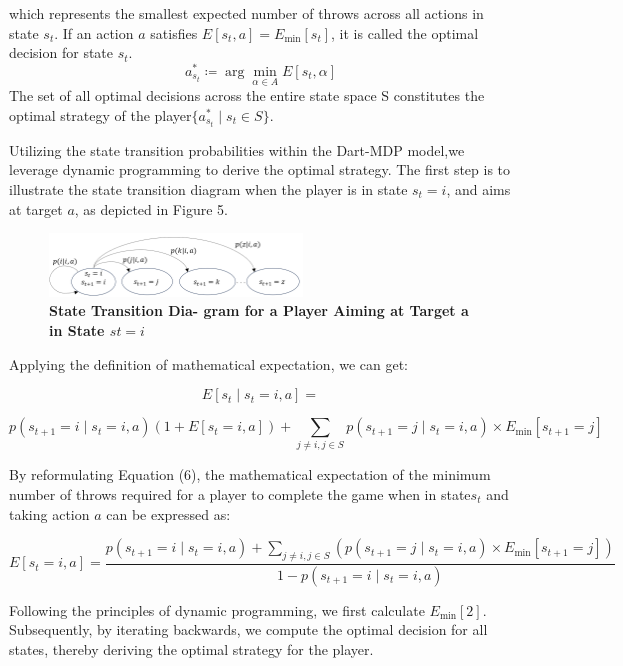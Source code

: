 \documentclass[cjjs]{ipart}
\theoremstyle{plain}
\begin{document}
which represents the smallest expected number of throws across all actions in state $s_t$. If an action $a$ satisfies $E[s_t, a] = E_{\min}[s_t]$, it is called the optimal decision for state $s_t$.
\[
a_{s_t}^* \coloneqq \arg\min_{\alpha \in A} E[s_t, \alpha]
\]
The set of all optimal decisions across the entire state space S constitutes the optimal strategy of the player$\{ a_{s_t}^* \mid s_t \in S \}$.

Utilizing the state transition probabilities within the Dart-MDP model,we leverage dynamic programming to derive the optimal strategy. The first step is to illustrate the state transition diagram when the player is in state $s_t = i$, and aims at target $a$, as depicted in Figure 5.

\begin{figure}[h]
    \centering
    \includegraphics[width=0.60\textwidth]{5.png} 
    \caption{\textbf{State Transition Dia-
gram for a Player Aiming at Target a in State $st = i$}}
    \label{fig:dartboard}
\end{figure}

Applying the definition of mathematical expectation, we can get:

$$E[s_t \mid s_t = i, a] =$$

\begin{equation}
p(s_{t+1} = i \mid s_t = i, a) \left( 1 + E[s_t = i, a] \right) + \sum_{j \neq i, j \in S} p(s_{t+1} = j \mid s_t = i, a) \times E_{\min}[s_{t+1} = j] \tag{6}
\end{equation}

By reformulating Equation (6), the mathematical expectation of the minimum number of throws required for a player to complete the game when in state$s_t$ and taking action $a$ can be expressed as:

\begin{equation}
E[s_t = i, a] = \frac{p(s_{t+1} = i \mid s_t = i, a) + \sum_{j \neq i, j \in S} \left( p(s_{t+1} = j \mid s_t = i, a) \times E_{\min}[s_{t+1} = j] \right)}{1 - p(s_{t+1} = i \mid s_t = i, a)}
\tag{7}
\end{equation}

Following the principles of dynamic programming, we first calculate $E_{\min}[2]$. Subsequently, by iterating backwards, we compute the optimal decision for all states, thereby deriving the optimal strategy for the player.
\end{document}
